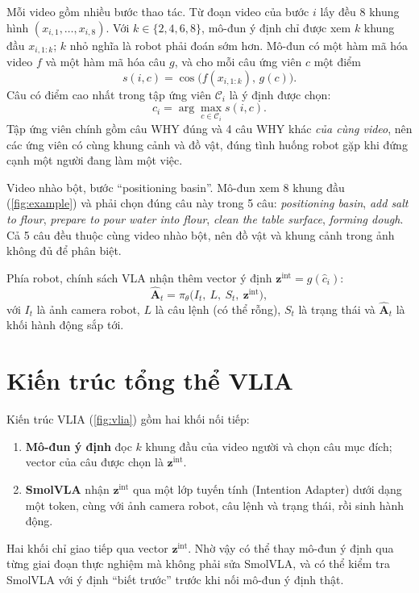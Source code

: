 \documentclass[a4paper,oneside]{report}
\begin{document}
Mỗi video gồm nhiều bước thao tác. Từ đoạn video của bước $i$ lấy đều 8 khung hình $(x_{i,1},\dots,x_{i,8})$. Với $k\in\{2,4,6,8\}$, mô-đun ý định chỉ được xem $k$ khung đầu $x_{i,1:k}$; $k$ nhỏ nghĩa là robot phải đoán sớm hơn. Mô-đun có một hàm mã hóa video $f$ và một hàm mã hóa câu $g$, và cho mỗi câu ứng viên $c$ một điểm
\begin{equation}
  s(i,c) = \cos\big(f(x_{i,1:k}),\, g(c)\big).
  \label{eq:score}
\end{equation}
Câu có điểm cao nhất trong tập ứng viên $\mathcal{C}_i$ là ý định được chọn:
\begin{equation}
  \hat{c}_i = \arg\max_{c\in\mathcal{C}_i} s(i,c).
\end{equation}
Tập ứng viên chính gồm câu WHY đúng và 4 câu WHY khác \textit{của cùng video}, nên các ứng viên có cùng khung cảnh và đồ vật, đúng tình huống robot gặp khi đứng cạnh một người đang làm một việc.

\begin{giaithich}[Ví dụ cụ thể]
Video nhào bột, bước ``positioning basin''. Mô-đun xem 8 khung đầu (\cref{fig:example}) và phải chọn đúng câu này trong 5 câu: \textit{positioning basin}, \textit{add salt to flour}, \textit{prepare to pour water into flour}, \textit{clean the table surface}, \textit{forming dough}. Cả 5 câu đều thuộc cùng video nhào bột, nên đồ vật và khung cảnh trong ảnh không đủ để phân biệt.
\end{giaithich}

Phía robot, chính sách VLA nhận thêm vector ý định $\mathbf{z}^{\mathrm{int}}=g(\hat{c}_i)$:
\begin{equation}
  \hat{\mathbf{A}}_t = \pi_\theta\big(I_t,\ L,\ S_t,\ \mathbf{z}^{\mathrm{int}}\big),
\end{equation}
với $I_t$ là ảnh camera robot, $L$ là câu lệnh (có thể rỗng), $S_t$ là trạng thái và $\hat{\mathbf{A}}_t$ là khối hành động sắp tới.

\section{Kiến trúc tổng thể VLIA}
\label{sec:vlia}

Kiến trúc VLIA (\cref{fig:vlia}) gồm hai khối nối tiếp:
\begin{enumerate}
  \item \textbf{Mô-đun ý định} đọc $k$ khung đầu của video người và chọn câu mục đích; vector của câu được chọn là $\mathbf{z}^{\mathrm{int}}$.
  \item \textbf{SmolVLA} nhận $\mathbf{z}^{\mathrm{int}}$ qua một lớp tuyến tính (Intention Adapter) dưới dạng một token, cùng với ảnh camera robot, câu lệnh và trạng thái, rồi sinh hành động.
\end{enumerate}
Hai khối chỉ giao tiếp qua vector $\mathbf{z}^{\mathrm{int}}$. Nhờ vậy có thể thay mô-đun ý định qua từng giai đoạn thực nghiệm mà không phải sửa SmolVLA, và có thể kiểm tra SmolVLA với ý định ``biết trước'' trước khi nối mô-đun ý định thật.
\end{document}
